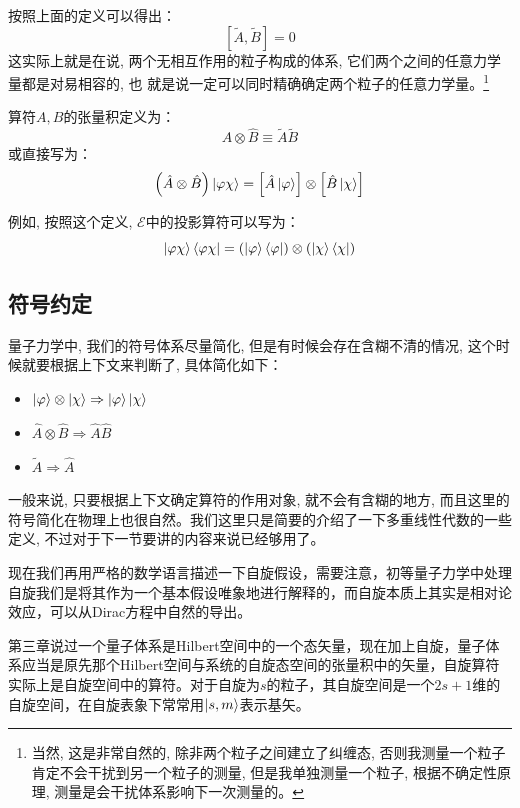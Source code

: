 \documentclass[a4paper,zihao=-4,linespread=1]{ctexrep}
\begin{document}
    按照上面的定义可以得出：\[\left[\tilde{A},\tilde{B}\right]=0\]这实际上就是在说, 两个无相互作用的粒子构成的体系, 它们两个之间的任意力学量都是对易相容的, 也
    就是说一定可以同时精确确定两个粒子的任意力学量。\footnote{当然, 这是非常自然的, 除非两个粒子之间建立了纠缠态, 否则我测量一个粒子肯定不会干扰到另一个粒子的测量, 但是我单独测量一个粒子, 根据不确定性原理, 测量是会干扰体系影响下一次测量的。}

    算符$A,B$的张量积定义为：
    \begin{equation}
        \boxed{
            \hat{A}\otimes\hat{B}\equiv\tilde{A}\tilde{B}
        }
    \end{equation}
    或直接写为：
    \begin{equation}
        \left(\hat{A}\otimes\hat{B}\right)\ket{\varphi\chi}=\left[\hat{A}\ket{\varphi}\right]\otimes\left[\hat{B}\ket{\chi}\right]
    \end{equation}
    
    例如, 按照这个定义, $\mathscr{E}$中的投影算符可以写为：
    \begin{equation}
        \ket{\varphi\chi}\bra{\varphi\chi}=\left(\ket{\varphi}\bra{\varphi}\right)\otimes\left(\ket{\chi}\bra{\chi}\right)
    \end{equation}
    \subsection*{符号约定}
    量子力学中, 我们的符号体系尽量简化, 但是有时候会存在含糊不清的情况, 这个时候就要根据上下文来判断了, 具体简化如下：
    \begin{itemize}
        \item $\ket{\varphi}\otimes\ket{\chi}\Rightarrow\ket{\varphi}\ket{\chi}$
        \item $\hat A\otimes \hat B\Rightarrow \hat{A}\hat{B}$
        \item $\tilde{A}\Rightarrow\hat{A}$
    \end{itemize}
    
    一般来说, 只要根据上下文确定算符的作用对象, 就不会有含糊的地方, 而且这里的符号简化在物理上也很自然。我们这里只是简要的介绍了一下多重线性代数的一些定义, 不过对于下一节要讲的内容来说已经够用了。
    
    现在我们再用严格的数学语言描述一下自旋假设，需要注意，初等量子力学中处理自旋我们是将其作为一个基本假设唯象地进行解释的，而自旋本质上其实是相对论效应，可以从Dirac方程中自然的导出。
    
    第三章说过一个量子体系是Hilbert空间中的一个态矢量，现在加上自旋，量子体系应当是原先那个Hilbert空间与系统的自旋态空间的张量积中的矢量，自旋算符实际上是自旋空间中的算符。对于自旋为$s$的粒子，其自旋空间是一个$2s+1$维的自旋空间，在自旋表象下常常用$\ket{s,m}$表示基矢。
    
\end{document}
